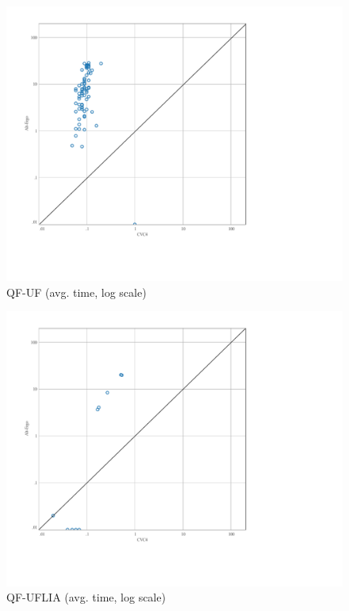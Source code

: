 \documentclass[10pt,letter]{article}
\theoremstyle{definition}
\begin{document}
\begin{figure}
\centering
\includegraphics[scale=0.42,trim=0.6cm 0 0 0,clip=true]{./testanalysis/ScatterQFUF.pdf}
\caption{QF-UF (avg. time, log scale)}
\label{f:qfuf}
\end{figure}

\begin{figure}
\centering
\includegraphics[scale=0.42,trim=0.5cm 0.5cm 0 0, clip=true]{./testanalysis/ScatterQFUFLIA.pdf}
\caption{QF-UFLIA (avg. time, log scale)}
\label{f:qfuflia}
\end{figure}
\end{document}
